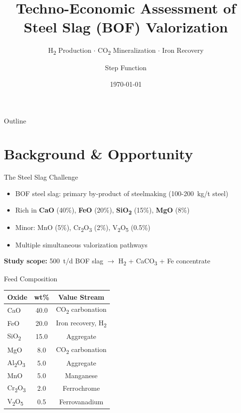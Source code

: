 \documentclass[aspectratio=169]{beamer}
\title{Techno-Economic Assessment of\\[4pt] \textbf{Steel Slag (BOF)} Valorization}
\subtitle{H\textsubscript{2} Production \(\cdot\) CO\textsubscript{2} Mineralization \(\cdot\) Iron Recovery}
\author{Step Function}
\date{\today}
\begin{document}
\begin{frame}
\titlepage
\end{frame}

\begin{frame}{Outline}
\tableofcontents
\end{frame}

\section{Background \& Opportunity}

\begin{frame}{The Steel Slag Challenge}

\begin{itemize}
  \item BOF steel slag: primary by-product of steelmaking (\SI{100}{}-\SI{200}{kg/t} steel)
  \item Rich in \textbf{CaO} (40\%), \textbf{FeO} (20\%), \textbf{SiO\textsubscript{2}} (15\%), \textbf{MgO} (8\%)
  \item Minor: MnO (5\%), Cr\textsubscript{2}O\textsubscript{3} (2\%), V\textsubscript{2}O\textsubscript{5} (0.5\%)
  \item Multiple simultaneous valorization pathways
\end{itemize}

\vspace{10pt}
\textbf{Study scope:} \SI{500}{t/d} BOF slag $\rightarrow$ H\textsubscript{2} + CaCO\textsubscript{3} + Fe concentrate
\end{frame}

\begin{frame}{Feed Composition}

\centering
\begin{tabular}{lcc}
\toprule
\textbf{Oxide} & \textbf{wt\%} & \textbf{Value Stream} \\
\midrule
CaO          & 40.0 & CO\textsubscript{2} carbonation \\
FeO          & 20.0 & Iron recovery, H\textsubscript{2} \\
SiO\textsubscript{2} & 15.0 & Aggregate \\
MgO          &  8.0 & CO\textsubscript{2} carbonation \\
Al\textsubscript{2}O\textsubscript{3} &  5.0 & Aggregate \\
MnO          &  5.0 & Manganese \\
Cr\textsubscript{2}O\textsubscript{3} &  2.0 & Ferrochrome \\
V\textsubscript{2}O\textsubscript{5} &  0.5 & Ferrovanadium \\
\bottomrule
\end{tabular}
\end{frame}
\end{document}
